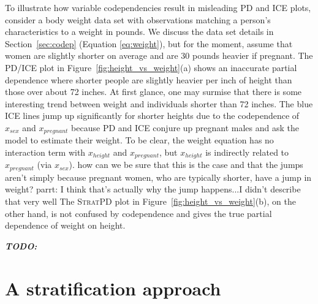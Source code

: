 \documentclass[12pt]{article}
\newcommand{\secref}[1]{Section~\ref{#1}}
\newcommand{\figref}[1]{Figure~\ref{#1}}
\newcommand{\todo}[1]{{\bf\em TODO:} {{\color{red}{#1}}}}
\newcommand{\spd}{\fontfamily{cmr}\textsc{\small StratPD}}
\begin{document}
To illustrate how variable codependencies result in misleading PD and ICE plots, consider a body weight data set with observations matching a person's characteristics to a weight in pounds. We discuss the data set details in \secref{sec:codep} (Equation \eqref{eq:weight}), but for the moment, assume that women are slightly shorter on average and are 30 pounds heavier if pregnant. The PD/ICE plot in \figref{fig:height_vs_weight}(a) shows an inaccurate partial dependence where shorter people are slightly heavier per inch of height than those over about 72 inches. At first glance, one may surmise that there is some interesting trend between weight and individuals shorter than 72 inches. The blue ICE lines jump up significantly for shorter heights due to the codependence of $x_{sex}$ and $x_{pregnant}$ because PD and ICE conjure up pregnant males and ask the model to estimate their weight. To be clear, the weight equation has no interaction term with $x_{height}$ and $x_{pregnant}$, but $x_{height}$ is indirectly related to $x_{pregnant}$ (via $x_{sex}$). {\color{red} how can we be sure that this is the case and that the jumps aren't simply because pregnant women, who are typically shorter, have a jump in weight? parrt: I think that's actually why the jump happens...I didn't describe that very well} The \spd{} plot in \figref{fig:height_vs_weight}(b), on the other hand, is not confused by codependence and gives the true partial dependence of weight on height. 

\todo{needs a transition sentence here}

\section{A stratification approach}

\end{document}

